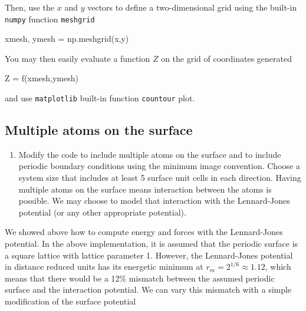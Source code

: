 \documentclass[11pt]{article}
\providecommand{\tightlist}{%
      \setlength{\itemsep}{0pt}\setlength{\parskip}{0pt}}
\newenvironment{Shaded}{}{}
\newcommand{\NormalTok}[1]{{#1}}
\newcommand{\OperatorTok}[1]{\textcolor[rgb]{0.40,0.40,0.40}{{#1}}}
\begin{document}
Then, use the \(x\) and \(y\) vectors to define a two-dimensional grid
using the built-in \texttt{numpy} function \texttt{meshgrid}

\begin{Shaded}
\begin{Highlighting}[]
\NormalTok{xmesh, ymesh }\OperatorTok{=}\NormalTok{ np.meshgrid(x,y)}
\end{Highlighting}
\end{Shaded}

You may then easily evaluate a function \(Z\) on the grid of coordinates
generated

\begin{Shaded}
\begin{Highlighting}[]
\NormalTok{Z }\OperatorTok{=}\NormalTok{ f(xmesh,ymesh)}
\end{Highlighting}
\end{Shaded}

and use \texttt{matplotlib} built-in function \texttt{countour} plot.

    \hypertarget{multiple-atoms-on-the-surface}{%
\subsection{Multiple atoms on the
surface}\label{multiple-atoms-on-the-surface}}

\begin{enumerate}
\def\labelenumi{\arabic{enumi}.}
\setcounter{enumi}{1}
\tightlist
\item
  Modify the code to include multiple atoms on the surface and to
  include periodic boundary conditions using the minimum image
  convention. Choose a system size that includes at least 5 surface unit
  cells in each direction. Having multiple atoms on the surface means
  interaction between the atoms is possible. We may choose to model that
  interaction with the Lennard-Jones potential (or any other appropriate
  potential).
\end{enumerate}

We showed above how to compute energy and forces with the Lennard-Jones
potential. In the above implementation, it is assumed that the periodic
surface is a square lattice with lattice parameter 1. However, the
Lennard-Jones potential in distance reduced units has its energetic
minimum at \(r_m = 2^{1/6} \approx 1.12\), which means that there would
be a 12\% mismatch between the assumed periodic surface and the
interaction potential. We can vary this mismatch with a simple
modification of the surface potential
\end{document}
